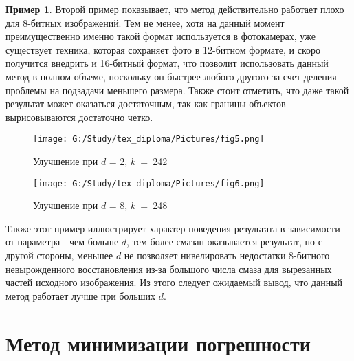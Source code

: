 \documentclass[a4paper]{article}
\theoremstyle{definition}
\newtheorem*{example}{Пример}
\begin{document}
\begin{example}

Второй пример показывает, что метод действительно работает плохо для 8-битных изображений. Тем не менее, хотя на данный момент преимущественно именно такой формат используется в фотокамерах, уже существует техника, которая сохраняет фото в 12-битном формате, и скоро получится внедрить и 16-битный формат, что позволит использовать данный метод в полном объеме, поскольку он быстрее любого другого за счет деления проблемы на подзадачи меньшего размера. Также стоит отметить, что даже такой результат может оказаться достаточным, так как границы объектов вырисовываются достаточно четко.

\begin{minipage}{70mm}
    \begin{figure}[H]
            \texttt{[image: G:/Study/tex\_diploma/Pictures/fig5.png]}
            \label{Fig3}
            \caption[Улучшение при $d$ = 2, $k$~=~242]{Улучшение при $d$ = 2, $k$~=~242}
        \end{figure}
\end{minipage}
\hfill
\begin{minipage}{70mm}
  \begin{figure}[H]
            \texttt{[image: G:/Study/tex\_diploma/Pictures/fig6.png]}
            \label{Fig4}
            \caption[Улучшение при $d$ = 8, $k$~=~248]{Улучшение при $d$ = 8, $k$~=~248}
        \end{figure}
\end{minipage}
\hfill

\vspace*{5mm}


Также этот пример иллюстрирует характер поведения результата в зависимости от параметра - чем больше $d$, тем более смазан оказывается результат, но с другой стороны, меньшее $d$ не позволяет нивелировать недостатки 8-битного невырожденного восстановления из-за большого числа смаза для вырезанных частей исходного изображения. Из этого следует ожидаемый вывод, что данный метод работает лучше при больших $d$.

\end{example}


    \newpage


    \section{Метод минимизации погрешности}
\end{document}
